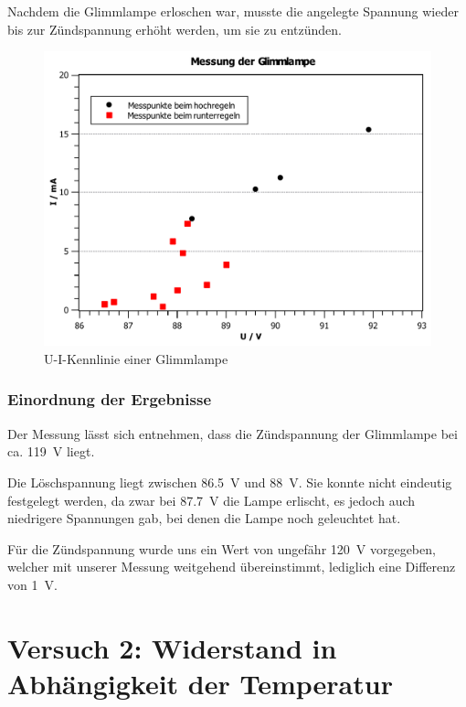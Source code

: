 \documentclass[11pt,a4paper,titlepage, ngerman]{article}
\begin{document}
				Nachdem die Glimmlampe erloschen war, musste die angelegte Spannung wieder bis zur Zündspannung erhöht werden, um sie zu entzünden.
			
				\begin{figure}
					\centering
					\includegraphics[width=\textwidth]{KennlinieGlimmlampe.pdf}
					\caption{U-I-Kennlinie einer Glimmlampe}
					\label{KL e}
				\end{figure}
			
			\subsubsection*{Einordnung der Ergebnisse}
			
				Der Messung lässt sich entnehmen, dass die Zündspannung der Glimmlampe bei ca. \SI{119}{\V} liegt.
				
				Die Löschspannung liegt zwischen \SI{86,5}{\V} und \SI{88}{\V}. Sie konnte nicht eindeutig festgelegt werden, da zwar bei \SI{87,7}{\V} die Lampe erlischt, es jedoch auch niedrigere Spannungen gab, bei denen die Lampe noch geleuchtet hat.
				
				Für die Zündspannung wurde uns ein Wert von ungefähr \SI{120}{\V} vorgegeben, welcher mit unserer Messung weitgehend übereinstimmt, lediglich eine Differenz von \SI{1}{\V}.
					
	\newpage	
	\section{Versuch 2: Widerstand in Abhängigkeit der Temperatur}		
		
\end{document}

